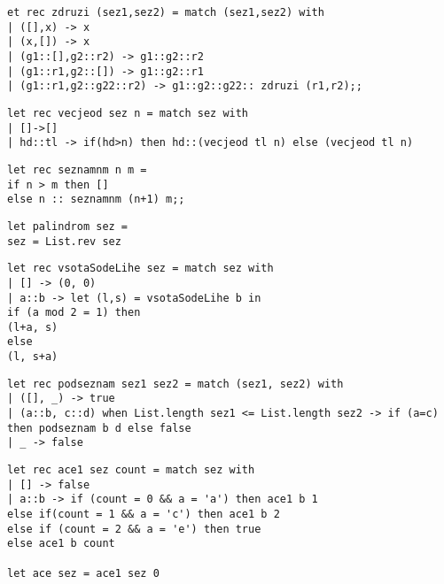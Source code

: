 \begin{Odgovor}{14}
\begin{verbatim}
et rec zdruzi (sez1,sez2) = match (sez1,sez2) with
| ([],x) -> x
| (x,[]) -> x
| (g1::[],g2::r2) -> g1::g2::r2
| (g1::r1,g2::[]) -> g1::g2::r1
| (g1::r1,g2::g22::r2) -> g1::g2::g22:: zdruzi (r1,r2);;
\end{verbatim}
\end{Odgovor}
\begin{Odgovor}{15}
\begin{verbatim}
let rec vecjeod sez n = match sez with
| []->[]
| hd::tl -> if(hd>n) then hd::(vecjeod tl n) else (vecjeod tl n)
\end{verbatim}
\end{Odgovor}
\begin{Odgovor}{16}
\begin{verbatim}
let rec seznamnm n m =
if n > m then []
else n :: seznamnm (n+1) m;;
\end{verbatim}
\end{Odgovor}
\begin{Odgovor}{17}
\begin{verbatim}
let palindrom sez =
sez = List.rev sez
\end{verbatim}
\end{Odgovor}
\begin{Odgovor}{18}
\begin{verbatim}
let rec vsotaSodeLihe sez = match sez with
| [] -> (0, 0)
| a::b -> let (l,s) = vsotaSodeLihe b in
if (a mod 2 = 1) then
(l+a, s)
else
(l, s+a)
\end{verbatim}
\end{Odgovor}
\begin{Odgovor}{19}
\begin{verbatim}
let rec podseznam sez1 sez2 = match (sez1, sez2) with
| ([], _) -> true
| (a::b, c::d) when List.length sez1 <= List.length sez2 -> if (a=c) then podseznam b d else false
| _ -> false
\end{verbatim}
\end{Odgovor}
\begin{Odgovor}{21}
\begin{verbatim}
let rec ace1 sez count = match sez with
| [] -> false
| a::b -> if (count = 0 && a = 'a') then ace1 b 1
else if(count = 1 && a = 'c') then ace1 b 2
else if (count = 2 && a = 'e') then true
else ace1 b count

let ace sez = ace1 sez 0
\end{verbatim}
\end{Odgovor}
